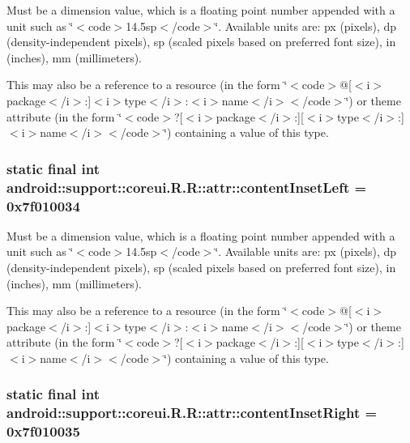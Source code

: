 Must be a dimension value, which is a floating point number appended with a unit such as \char`\"{}$<$code$>$14.5sp$<$/code$>$\char`\"{}. Available units are: px (pixels), dp (density-independent pixels), sp (scaled pixels based on preferred font size), in (inches), mm (millimeters). 

This may also be a reference to a resource (in the form \char`\"{}$<$code$>$@\mbox{[}$<$i$>$package$<$/i$>$:\mbox{]}$<$i$>$type$<$/i$>$:$<$i$>$name$<$/i$>$$<$/code$>$\char`\"{}) or theme attribute (in the form \char`\"{}$<$code$>$?\mbox{[}$<$i$>$package$<$/i$>$:\mbox{]}\mbox{[}$<$i$>$type$<$/i$>$:\mbox{]}$<$i$>$name$<$/i$>$$<$/code$>$\char`\"{}) containing a value of this type. \hypertarget{classandroid_1_1support_1_1coreui_1_1_r_1_1attr_98feb3093bb14b6bd44f9b2e20ba30ec}{
\subsubsection[{contentInsetLeft}]{\setlength{\rightskip}{0pt plus 5cm}static final int android::support::coreui.R.R::attr::contentInsetLeft = 0x7f010034}}
\label{classandroid_1_1support_1_1coreui_1_1_r_1_1attr_98feb3093bb14b6bd44f9b2e20ba30ec}


Must be a dimension value, which is a floating point number appended with a unit such as \char`\"{}$<$code$>$14.5sp$<$/code$>$\char`\"{}. Available units are: px (pixels), dp (density-independent pixels), sp (scaled pixels based on preferred font size), in (inches), mm (millimeters). 

This may also be a reference to a resource (in the form \char`\"{}$<$code$>$@\mbox{[}$<$i$>$package$<$/i$>$:\mbox{]}$<$i$>$type$<$/i$>$:$<$i$>$name$<$/i$>$$<$/code$>$\char`\"{}) or theme attribute (in the form \char`\"{}$<$code$>$?\mbox{[}$<$i$>$package$<$/i$>$:\mbox{]}\mbox{[}$<$i$>$type$<$/i$>$:\mbox{]}$<$i$>$name$<$/i$>$$<$/code$>$\char`\"{}) containing a value of this type. \hypertarget{classandroid_1_1support_1_1coreui_1_1_r_1_1attr_ffe361eef1f36fcd84ce27ed23ca62b9}{
\subsubsection[{contentInsetRight}]{\setlength{\rightskip}{0pt plus 5cm}static final int android::support::coreui.R.R::attr::contentInsetRight = 0x7f010035}}
\label{classandroid_1_1support_1_1coreui_1_1_r_1_1attr_ffe361eef1f36fcd84ce27ed23ca62b9}


